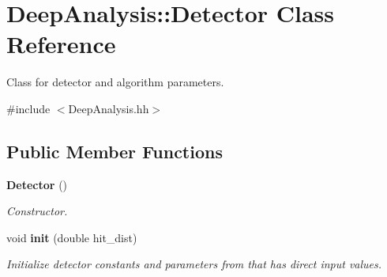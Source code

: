 \section{Deep\-Analysis\-:\-:Detector Class Reference}
\label{classDeepAnalysis_1_1Detector}


Class for detector and algorithm parameters.  




{\ttfamily \#include $<$Deep\-Analysis.\-hh$>$}

\subsection*{Public Member Functions}
\begin{DoxyCompactItemize}
\item 
{\bf Detector} ()
\begin{DoxyCompactList}\small\item\em Constructor. \end{DoxyCompactList}\item 
void {\bf init} (double hit\-\_\-dist)
\begin{DoxyCompactList}\small\item\em Initialize detector constants and parameters from that has direct input values. \end{DoxyCompactList}\end{DoxyCompactItemize}
